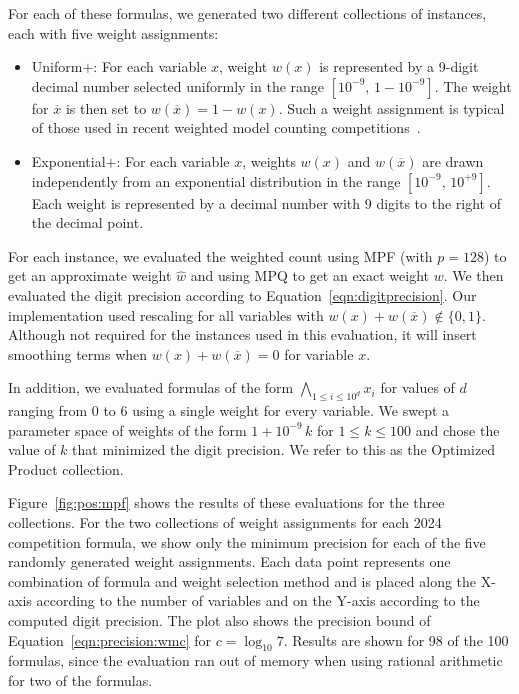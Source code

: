 \documentclass[letterpaper,USenglish,cleveref, autoref, thm-restate]{lipics-v2021}
\newcommand{\obar}[1]{\overline{#1}}
\newcommand{\approximate}[1]{\hat{#1}}
\newcommand{\approxw}{\approximate{w}}
\begin{document}
For each of these formulas, we generated two different collections of instances, each with five weight assignments:
\begin{itemize}
\item \textsf{Uniform$+$}: For each variable $x$, weight $w(x)$ is represented by a 9-digit decimal number selected uniformly in the range
  $[10^{-9},\,1-10^{-9}]$. The weight for $\obar{x}$ is then set to
  $w(\obar{x}) = 1-w(x)$.  Such a weight assignment is typical of those used in recent weighted model counting competitions~\cite{fichte:jea:2020}.
\item \textsf{Exponential$+$}: For each variable $x$, weights $w(x)$ and $w(\obar{x})$
  are drawn independently from an exponential distribution in the range
  $[10^{-9},\,10^{+9}]$.  Each weight is represented by a decimal number with 9 digits to the right of the decimal point.
\end{itemize}


For each instance, we evaluated
the weighted count using MPF (with $p=128$) to get an approximate weight $\approxw$ and
using MPQ to get an exact weight $w$.  We then evaluated the digit precision according to Equation~\ref{eqn:digitprecision}.   Our implementation used rescaling for all variables
with $w(x) + w(\obar{x}) \not \in \{0, 1\}$.
Although not required for the instances used in this evaluation,
it will insert smoothing terms when $w(x) + w(\obar{x}) = 0$ for variable $x$.

In addition, we evaluated formulas of the form $\bigwedge_{1\leq i
  \leq 10^d} x_i$ for values of $d$ ranging from $0$ to $6$ using a
single weight for every variable.  We swept a parameter space of
weights of the form $1 + 10^{-9}\,k$ for $1 \leq k \leq 100$ and
chose the value of $k$ that minimized the digit precision.  We refer
to this as the \textsf{Optimized Product} collection.

Figure~\ref{fig:pos:mpf} shows the results of these evaluations for
the three collections.  For the two collections of weight assignments for each 2024 competition formula,
we show only the minimum precision for each of the five randomly
generated  weight assignments.  Each data point
represents one combination of formula and weight selection method and is placed
along the X-axis according to the number of variables
and on the Y-axis according to the computed digit precision.
The plot also shows the precision bound of Equation~\ref{eqn:precision:wmc} for $c=\log_{10} 7$.
Results are shown for 98 of the 100 formulas, since the evaluation ran out of memory when using rational arithmetic for two of the formulas.
\end{document}
